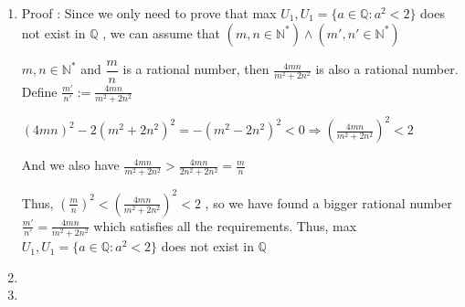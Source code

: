 \documentclass{article}
\begin{document}
\begin{enumerate}
    \item Proof : Since we only need to prove that max $U_1,U_1=\{a\in \mathbb{Q} \colon a^2<2 \}$ does not exist in $\mathbb{Q}$ , we can assume that $ (m,n\in \mathbb{N}^* )\wedge  (m',n'\in \mathbb{N}^* )	$
    
    $m,n\in \mathbb{N}^*$ and $\dfrac{m}{n}$ is a rational number, then $\frac{4 m n}{m^2+2 n^2}$ is also a rational number. Define $\frac{m'}{n'} := \frac{4 m n}{m^2+2 n^2}$
    
    $ (4mn)^2-2(m^2+2n^2)^2=-(m^2-2n^2)^2<0 \Rightarrow
   ( \frac{4 m n}{m^2+2 n^2})^2<2		$ 
   
   And we also have 
      $	\frac{4 m n}{m^2+2 n^2}> \frac{4mn}{2n^2+2n^2}=\frac{m}{n}	$
   
   Thus, $ (\frac{m}{n})^2 < (\frac{4 m n}{m^2+2 n^2})^2 < 2 $ , so we have found a bigger rational number $\frac{m'}{n'} = \frac{4 m n}{m^2+2 n^2}$ which satisfies all the requirements. Thus, max $U_1,U_1=\{a\in \mathbb{Q} \colon a^2<2 \}$ does not exist in $\mathbb{Q}$
   
   \item
   
   
   \item
    							

\end{enumerate}
\end{document}
